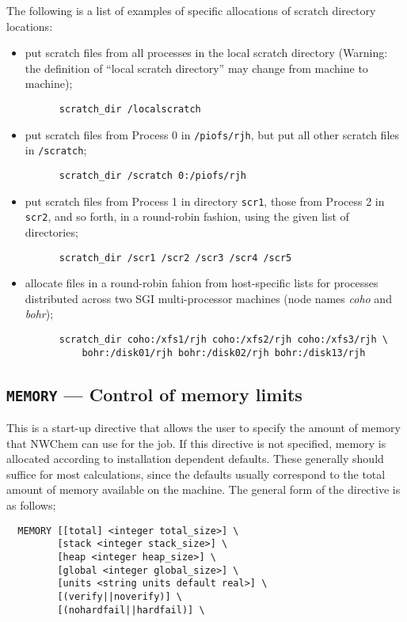 The following is a list of examples of specific allocations of scratch
directory locations:
\begin{itemize}
\item put scratch files from all processes in the local scratch directory 
(Warning: the definition of ``local scratch directory'' may change from 
machine to machine);
\begin{verbatim}
      scratch_dir /localscratch
\end{verbatim}
\item put scratch files from Process 0 in \verb+/piofs/rjh+, but put all 
other scratch files in \verb+/scratch+;
\begin{verbatim}
      scratch_dir /scratch 0:/piofs/rjh
\end{verbatim}
\item put scratch files from Process 1 in directory \verb+scr1+, those from
Process 2 in \verb+scr2+, and so forth, in a round-robin fashion, using the
given list of directories;
\begin{verbatim}
      scratch_dir /scr1 /scr2 /scr3 /scr4 /scr5
\end{verbatim}
\item allocate files in a round-robin fahion from
  host-specific lists for processes distributed across two
 SGI multi-processor machines (node names {\it coho} and {\it bohr});
\begin{verbatim}
      scratch_dir coho:/xfs1/rjh coho:/xfs2/rjh coho:/xfs3/rjh \
          bohr:/disk01/rjh bohr:/disk02/rjh bohr:/disk13/rjh
\end{verbatim}
\end{itemize}

\subsection{{\tt MEMORY} --- Control of memory limits}

This is a start-up directive that allows the user to specify the
amount of memory that NWChem can use for the job.  If this directive
is not specified, memory is allocated according to installation
dependent defaults.  These generally should suffice for most
calculations, since the defaults usually correspond to the total amount
of memory available on the machine.  The general form of the directive
is as follows;

\begin{verbatim}
  MEMORY [[total] <integer total_size>] \
         [stack <integer stack_size>] \
         [heap <integer heap_size>] \
         [global <integer global_size>] \
         [units <string units default real>] \
         [(verify||noverify)] \
         [(nohardfail||hardfail)] \
\end{verbatim}


